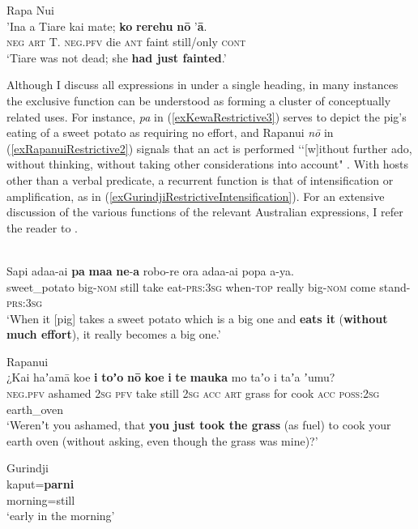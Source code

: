 \begin{exe}
	\ex Rapa Nui \label{exRapaNuiRestrictive}\\
	\gll 'Ina a Tiare kai mate; \textbf{ko} \textbf{rerehu} \textbf{nō} '\textbf{ā}.\\
	\textsc{neg} \textsc{art} T. \textsc{neg}.\textsc{pfv} die \textsc{ant} faint still/only \textsc{cont}\\
	\glt \lq Tiare was not dead; she \textbf{had just fainted}.' \parencite[343]{Kieviet2017}
\end{exe}

Although I discuss all expressions in  under a single heading, in many instances the exclusive function can be understood as forming a cluster of conceptually related uses. For instance,  \textit{pa} in (\ref{exKewaRestrictive3}) serves to depict the pig's eating of a sweet potato as requiring no effort, and Rapanui \textit{nō} in (\ref{exRapanuiRestrictive2}) signals that an act is performed \lq\lq{}[w]ithout further ado, without thinking, without taking other considerations into account" \parencite[343]{Kieviet2017}. With hosts other than a verbal predicate, a recurrent function is that of intensification or amplification, as in (\ref{exGurindjiRestrictiveIntensification}). For an extensive discussion of the various functions of the relevant Australian expressions, I refer the reader to \textcite{SchultzeBerndt2002}.

\begin{exe}
	\ex {}\label{exKewaRestrictive3}\\
	\gll Sapi adaa-ai \textbf{pa} \textbf{maa} \textbf{ne}-\textbf{a} robo-re ora adaa-ai popa a-ya.\\
	sweet\_potato big-\textsc{nom} still take eat-\textsc{prs}:3\textsc{sg} when-\textsc{top} really big-\textsc{nom} come stand-\textsc{prs}:3\textsc{sg}\\
	\glt \lq When it [pig] takes a sweet potato which is a big one and \textbf{eats it} (\textbf{without much effort}), it really becomes a big one.' \parencite[286]{Yarapea2006}
	
	\ex Rapanui\label{exRapanuiRestrictive2}\\
	\gll ¿Kai haʼamā koe \textbf{i} \textbf{toʼo} \textbf{nō} \textbf{koe} \textbf{i} \textbf{te} \textbf{mauka} mo taʼo i taʼa ʼumu?\\
	\phantom{¿}\textsc{neg}.\textsc{pfv} ashamed 2\textsc{sg} \textsc{pfv} take still 2\textsc{sg} \textsc{acc} \textsc{art} grass for cook \textsc{acc} \textsc{poss}:2\textsc{sg} earth\_oven\\
	\glt \lq Werenʼt you ashamed, that \textbf{you just took the grass} (as fuel) to cook your earth oven (without asking, even though the grass was mine)?' \parencite[343]{Kieviet2017}
	
	\ex Gurindji\label{exGurindjiRestrictiveIntensification}\\
	\gll kaput=\textbf{parni}\\
	morning=still\\
	\glt \lq early in the morning\rq{ }\parencite[19]{McConvell1983}
\end{exe}

